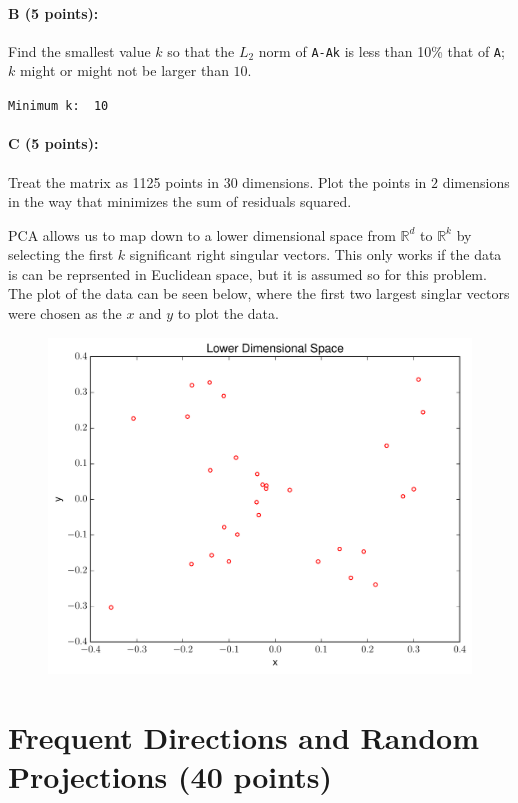 \documentclass[11pt]{article}
\begin{document}
\paragraph{B (5 points):}
Find the smallest value $k$ so that the $L_2$ norm of \texttt{A-Ak} is less than 10\% that of \texttt{A}; $k$ might or might not be larger than $10$.  

\verb~Minimum k:  10~

\paragraph{C (5 points):}
Treat the matrix as 1125 points in 30 dimensions.  Plot the points in $2$ dimensions in the way that minimizes the sum of residuals squared.  

PCA allows us to map down to a lower dimensional space from $\mathbb{R}^{d}$ to $\mathbb{R}^{k}$ by selecting the first $k$ significant right singular vectors. This only works if the data is can be reprsented in Euclidean space, but it is assumed so for this problem. The plot of the data can be seen below, where the first two largest singlar vectors were chosen as the $x$ and $y$ to plot the data.

\begin{figure}[H]
\centering
\includegraphics[width=.75\textwidth]{lower_dim.pdf}
\end{figure}



\section{Frequent Directions and Random Projections (40 points)}
\end{document}
